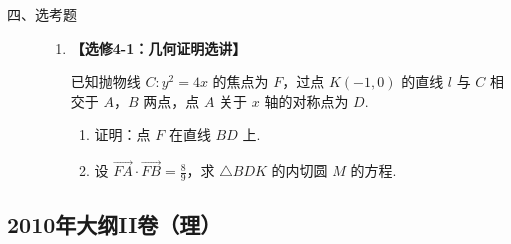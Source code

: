 \begin{description}

    \item[四、选考题]

    \begin{enumerate}[leftmargin=5pt]

      \addtocounter{enumi}{+21}

        \item \textbf{【选修4-1：几何证明选讲】}

已知抛物线 \(C: y^{2} = 4x\) 的焦点为 \(F\)，过点 \(K(-1,0)\) 的直线 \(l\) 与 \(C\) 相交于 \(A\)，\(B\) 两点，点 \(A\) 关于 \(x\) 轴的对称点为 \(D\).

\begin{enumerate}
\item 证明：点 \(F\) 在直线 \(BD\) 上.
\item 设 \(\overrightarrow{FA} \cdot \overrightarrow{FB} = \frac{8}{9}\)，求 \(\triangle BDK\) 的内切圆 \(M\) 的方程.
\end{enumerate}

    \end{enumerate}

\end{description}


\subsection{2010年大纲II卷（理）}\label{gk:2010年大纲II卷（理）}

